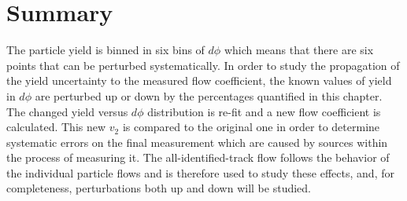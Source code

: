 \section{Summary}
The particle yield is binned in six bins of $d\phi$ which means that there are six points that can be perturbed systematically. In order to study the propagation of the yield uncertainty to the measured flow coefficient, the known values of yield in $d\phi$ are perturbed up or down by the percentages quantified in this chapter. The changed yield versus $d\phi$ distribution is re-fit and a new flow coefficient is calculated. This new $v_2$ is compared to the original one in order to determine systematic errors on the final measurement which are caused by sources within the process of measuring it. The all-identified-track flow follows the behavior of the individual particle flows and is therefore used to study these effects, and, for completeness, perturbations both up and down will be studied.

